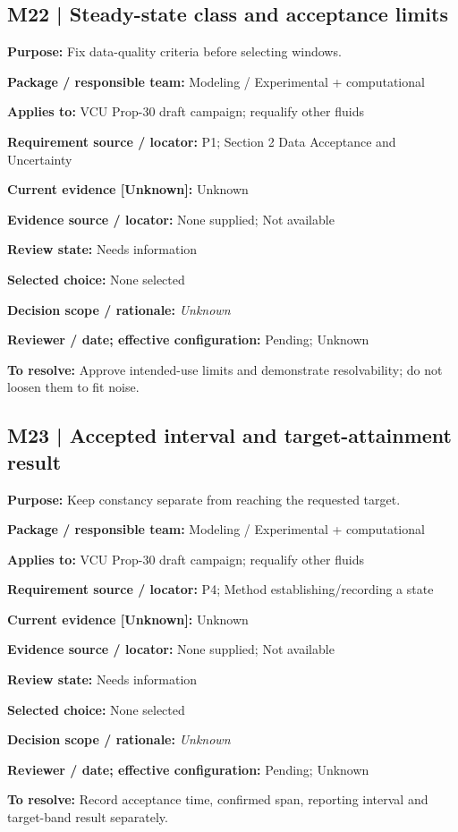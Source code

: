 \documentclass[11pt]{article}
\begin{document}
\begin{minipage}{\textwidth}\small\setlength{\parskip}{2pt}
\subsection*{M22 | Steady-state class and acceptance limits}
\textbf{Purpose:} Fix data-quality criteria before selecting windows.\par
\textbf{Package / responsible team:} Modeling / Experimental + computational\par
\textbf{Applies to:} VCU Prop-30 draft campaign; requalify other fluids\par
\textbf{Requirement source / locator:} P1; Section 2 Data Acceptance and Uncertainty\par
\textbf{Current evidence [Unknown]:} Unknown\par
\textbf{Evidence source / locator:} None supplied; Not available\par
\textbf{Review state:} Needs information\par
\textbf{Selected choice:} None selected\par
\textbf{Decision scope / rationale:} \textit{Unknown}\par
\textbf{Reviewer / date; effective configuration:} Pending; Unknown\par
\textbf{To resolve:} Approve intended-use limits and demonstrate resolvability; do not loosen them to fit noise.\par
\end{minipage}\par\vspace{5pt}
\begin{minipage}{\textwidth}\small\setlength{\parskip}{2pt}
\subsection*{M23 | Accepted interval and target-attainment result}
\textbf{Purpose:} Keep constancy separate from reaching the requested target.\par
\textbf{Package / responsible team:} Modeling / Experimental + computational\par
\textbf{Applies to:} VCU Prop-30 draft campaign; requalify other fluids\par
\textbf{Requirement source / locator:} P4; Method establishing/recording a state\par
\textbf{Current evidence [Unknown]:} Unknown\par
\textbf{Evidence source / locator:} None supplied; Not available\par
\textbf{Review state:} Needs information\par
\textbf{Selected choice:} None selected\par
\textbf{Decision scope / rationale:} \textit{Unknown}\par
\textbf{Reviewer / date; effective configuration:} Pending; Unknown\par
\textbf{To resolve:} Record acceptance time, confirmed span, reporting interval and target-band result separately.\par
\end{minipage}\par\vspace{5pt}
\end{document}
